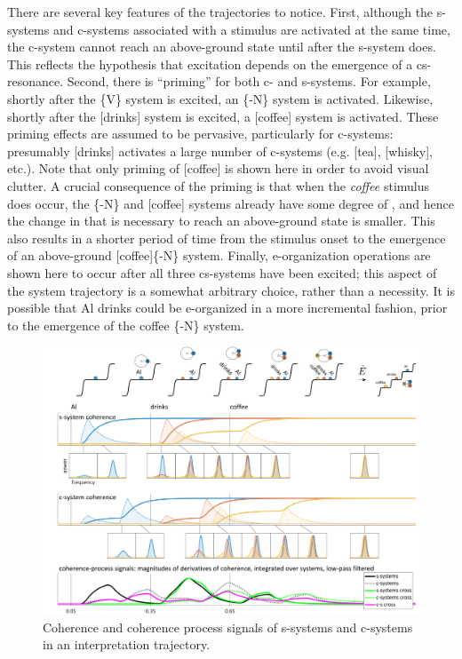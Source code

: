   There are several key features of the trajectories to notice. First, although the s-systems and c-systems associated with a stimulus are activated at the same time, the c-system cannot reach an above-ground state until after the s-system does. This reflects the hypothesis that excitation depends on the emergence of a cs-resonance. Second, there is “priming” for both c- and s-systems. For example, shortly after the \{V\} system is excited, an \{-N\} system is activated. Likewise, shortly after the [drinks] system is excited, a [coffee] system is activated. These priming effects are assumed to be pervasive, particularly for c-systems: presumably [drinks] activates a large number of c-systems (e.g. [tea], [whisky], etc.). Note that only priming of [coffee] is shown here in order to avoid visual clutter. A crucial consequence of the priming is that when the \textit{coffee} stimulus does occur, the \{-N\} and [coffee] systems already have some degree of , and hence the change in  that is necessary to reach an above-ground state is smaller. This also results in a shorter period of time from the stimulus onset to the emergence of an above-ground [coffee]\{-N\} system. Finally, e-organization operations are shown here to occur after all three cs-systems have been excited; this aspect of the system trajectory is a somewhat arbitrary choice, rather than a necessity. It is possible that {\textbar}Al drinks{\textbar} could be e-organized in a more incremental fashion, prior to the emergence of the {\textbar}coffee \{-N\}{\textbar} system. 

  
\begin{figure}
\includegraphics[width=\textwidth]{figures/Tilsen-img141.png}
\caption{Coherence and coherence process signals of s-systems and c-systems in an interpretation trajectory.}
\label{fig:6:22}
\end{figure}
 

